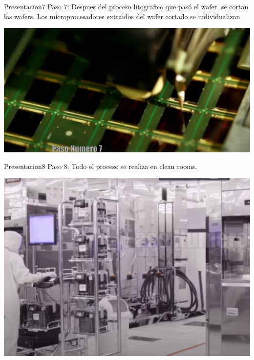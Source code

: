\documentclass[presentation]{beamer}
\begin{document}
\begin{frame}[label={sec:org88a6a27}]{Presentacion7}
Paso 7:
Despues del proceso litografico que pasó el wafer, se cortan los wafers.
Los microprocesadores extraidos del wafer cortado se individualizan
\begin{center}
\includegraphics[width=.9\linewidth]{./paso7.jpeg}
\end{center}
\end{frame}

\begin{frame}[label={sec:orga5d1a0e}]{Presentacion8}
Paso 8:
Todo el proceso se realiza en clean rooms.
\begin{center}
\includegraphics[width=.9\linewidth]{./paso8.jpeg}
\end{center}
\end{frame}
\end{document}
